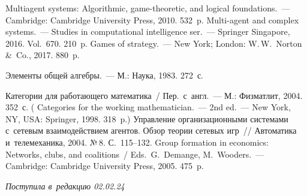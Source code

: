 \begin{multicols}{2}
{{\begin{thebibliography}{99}
 Multiagent systems: Algorithmic, game-theoretic, and logical 
foundations.~--- Cambridge: Cambridge University Press, 2010. 532~p.
 Multi-agent and complex systems.~--- Studies in computational 
intelligence ser.~--- Springer Singapore, 2016. Vol.~670. 210~p.
 Games of strategy.~--- New York; London: 
W.\,W.~Norton \&~Co., 2017. 880~p.

 Элементы общей алгебры.~--- М.: Наука, 1983. 272~с.


 Категории для работающего математика~/ Пер.\ с~англ.~--- М.: Физматлит, 2004. 352~с. 
( Categories for the working mathematician.~--- 2nd ed.~--- New York, NY, USA: 
Springer, 1998. 318~p.)
 Управление организационными системами с~сетевым взаимодействием агентов. 
Обзор теории сетевых игр~// Автоматика и~телемеханика, 2004. №\,8. С.~115--132.
Group formation in economics: Networks, clubs, and coalitions~/ Eds.\ G.~Demange, M.~Wooders.~--- 
Cambridge: Cambridge University Press, 2005. 475~p.

\end{thebibliography}

 }
 }

\end{multicols}

\vspace*{-9pt}

\hfill{\small\textit{Поступила в~редакцию 02.02.24}}


\pagebreak


\vspace*{-28pt}






\def\tit{ON FUNCTOR REPRESENTATION OF~OPTIMIZED\\ DYNAMIC~MULTIAGENT~SYSTEMS}


\def\titkol{On functor representation of~optimized dynamic multiagent systems}


